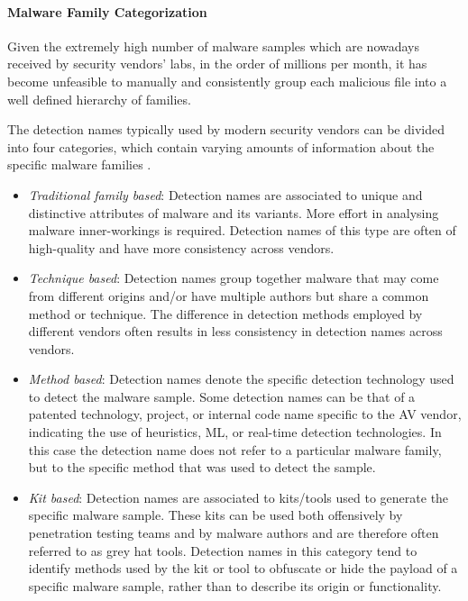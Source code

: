 \documentclass[pdfa%
,cucitura%
]{toptesi}
\begin{document}
\paragraph{Malware Family Categorization}
Given the extremely high number of malware samples which are nowadays received by security vendors' labs, in the order of millions per month, it has become unfeasible to manually and consistently group each malicious file into a well defined hierarchy of families. 

The detection names typically used by modern security vendors can be divided into four categories, which contain varying amounts of information about the specific malware families \cite{DucauAMDATSE}.

\begin{itemize}
	\item \textit{Traditional family based}: Detection names are associated to unique and distinctive attributes of malware and its variants. More effort in analysing malware inner-workings is required. Detection names of this type are often of high-quality and have more consistency across vendors.
	
	\item \textit{Technique based}: Detection names group together malware that may come from different origins and/or have multiple authors but share a common method or technique. The difference in detection methods employed by different vendors often results in less consistency in detection names across vendors.
	
	\item \textit{Method based}: Detection names denote the specific detection technology used to detect the malware sample. Some detection names can be that of a patented technology, project, or internal code name specific to the AV vendor, indicating the use of heuristics, ML, or real-time detection technologies. In this case the detection name does not refer to a particular malware family, but to the specific method that was used to detect the sample.
	
	\item \textit{Kit based}: Detection names are associated to kits/tools used to generate the specific malware sample. These kits can be used both offensively by penetration testing teams and by malware authors and are therefore often referred to as grey hat tools. Detection names in this category tend to identify methods used by the kit or tool to obfuscate or hide the payload of a specific malware sample, rather than to describe its origin or functionality.
\end{itemize}
\end{document}
